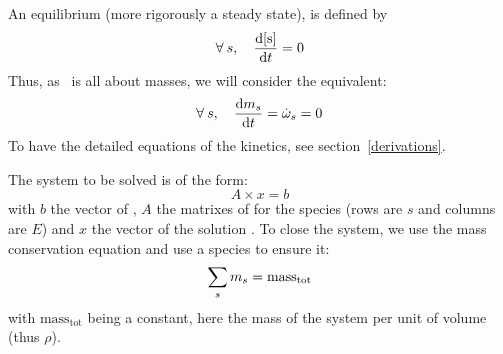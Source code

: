 An equilibrium (more rigorously a steady state), is defined
by
\begin{equation}
\forall\:s,\quad \doverdt{\conc[s]} = 0
\label{equilibrium:def}
\end{equation}
Thus, as \antioch\ is all about masses, we will consider
the equivalent:
\begin{equation}
\forall\:s,\quad \doverdt{\mass[s]} = \mdot[s] = 0
\label{equilibrium:def_by_mass}
\end{equation}
To have the detailed equations of the kinetics, see
section~\ref{derivations}.

The system to be solved is of the form:
\begin{equation}
A\times x = b
\end{equation}
with $b$ the vector of \mdot, $A$ the matrixes of \doverdm[E]{\mdot[s]} for
the species (rows are $s$ and columns are $E$) and $x$ the vector of the solution \mass.
To close the system, we use the mass conservation equation and use a
species to ensure it:
\begin{equation}
\sum_s \mass[s] = \mathrm{mass_{tot}}
\label{mass_cons}
\end{equation}
with $\mathrm{mass_{tot}}$ being a constant, here the mass of the system
per unit of volume (thus $\rho$).

